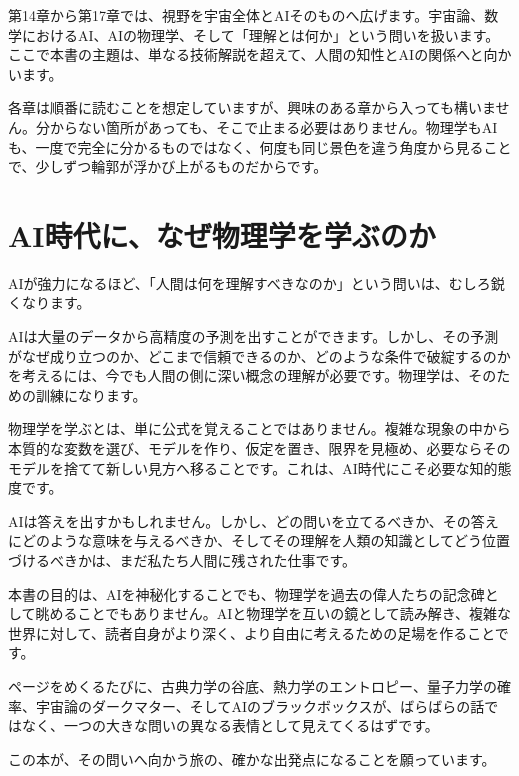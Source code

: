 第14章から第17章では、視野を宇宙全体とAIそのものへ広げます。宇宙論、数学におけるAI、AIの物理学、そして「理解とは何か」という問いを扱います。ここで本書の主題は、単なる技術解説を超えて、人間の知性とAIの関係へと向かいます。

各章は順番に読むことを想定していますが、興味のある章から入っても構いません。分からない箇所があっても、そこで止まる必要はありません。物理学もAIも、一度で完全に分かるものではなく、何度も同じ景色を違う角度から見ることで、少しずつ輪郭が浮かび上がるものだからです。

\section*{AI時代に、なぜ物理学を学ぶのか}

AIが強力になるほど、「人間は何を理解すべきなのか」という問いは、むしろ鋭くなります。

AIは大量のデータから高精度の予測を出すことができます。しかし、その予測がなぜ成り立つのか、どこまで信頼できるのか、どのような条件で破綻するのかを考えるには、今でも人間の側に深い概念の理解が必要です。物理学は、そのための訓練になります。

物理学を学ぶとは、単に公式を覚えることではありません。複雑な現象の中から本質的な変数を選び、モデルを作り、仮定を置き、限界を見極め、必要ならそのモデルを捨てて新しい見方へ移ることです。これは、AI時代にこそ必要な知的態度です。

AIは答えを出すかもしれません。しかし、どの問いを立てるべきか、その答えにどのような意味を与えるべきか、そしてその理解を人類の知識としてどう位置づけるべきかは、まだ私たち人間に残された仕事です。

本書の目的は、AIを神秘化することでも、物理学を過去の偉人たちの記念碑として眺めることでもありません。AIと物理学を互いの鏡として読み解き、複雑な世界に対して、読者自身がより深く、より自由に考えるための足場を作ることです。

ページをめくるたびに、古典力学の谷底、熱力学のエントロピー、量子力学の確率、宇宙論のダークマター、そしてAIのブラックボックスが、ばらばらの話ではなく、一つの大きな問いの異なる表情として見えてくるはずです。

この本が、その問いへ向かう旅の、確かな出発点になることを願っています。

